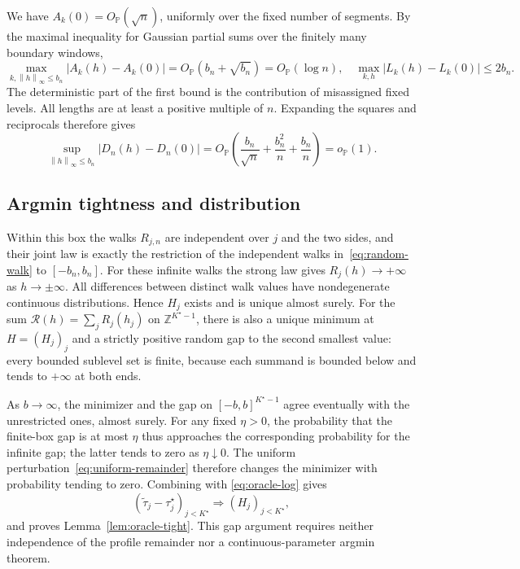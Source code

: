 \documentclass[pdflatex,sn-mathphys-num]{sn-jnl}
\newcommand{\Prob}{\mathbb P}
\newcommand{\Z}{\mathbb Z}
\newcommand{\taus}{\tau^\star}
\newcommand{\op}{o_{\Prob}}
\newcommand{\Op}{O_{\Prob}}
\newcommand{\norm}[1]{\left\lVert#1\right\rVert}
\theoremstyle{thmstyleone}
\theoremstyle{thmstyletwo}
\begin{document}
We have $A_k(0)=\Op(\sqrt n)$, uniformly over the fixed number of segments.
By the maximal inequality for Gaussian partial sums over the finitely many
boundary windows,
\[
\max_{k,\norm h_\infty\le b_n}|A_k(h)-A_k(0)|
=\Op(b_n+\sqrt{b_n})=\Op(\log n),
\quad
\max_{k,h}|L_k(h)-L_k(0)|\le2b_n.
\]
The deterministic part of the first bound is the contribution of
misassigned fixed levels. All lengths are at least a positive multiple of $n$.
Expanding the squares and reciprocals therefore gives
\begin{equation}\label{eq:uniform-remainder}
\sup_{\norm h_\infty\le b_n}|D_n(h)-D_n(0)|
=\Op\left(\frac{b_n}{\sqrt n}+\frac{b_n^2}{n}+\frac{b_n}{n}\right)=\op(1).
\end{equation}

\subsection{Argmin tightness and distribution}
Within this box the walks $R_{j,n}$ are independent over $j$ and the two
sides, and their joint law is exactly the restriction of the independent
walks in~\eqref{eq:random-walk} to $[-b_n,b_n]$.
For these infinite walks the strong law gives $R_j(h)\to+\infty$ as
$h\to\pm\infty$. All differences between distinct walk values have
nondegenerate continuous distributions. Hence $H_j$ exists and is unique
almost surely. For the sum $\mathcal R(h)=\sum_jR_j(h_j)$ on
$\Z^{K^\star-1}$, there is also a unique minimum at $H=(H_j)_j$ and a
strictly positive random gap to the second smallest value: every bounded
sublevel set is finite, because each summand is bounded below and tends
to $+\infty$ at both ends.

As $b\to\infty$, the minimizer and the gap on $[-b,b]^{K^\star-1}$ agree
eventually with the unrestricted ones, almost surely.
For any fixed $\eta>0$, the probability that the finite-box gap is at most
$\eta$ thus approaches the corresponding probability for the infinite gap;
the latter tends to zero as $\eta\downarrow0$.
The uniform perturbation~\eqref{eq:uniform-remainder} therefore changes the
minimizer with probability tending to zero. Combining with
\eqref{eq:oracle-log} gives
\begin{equation}\label{eq:oracle-walk-limit}
(\widetilde\tau_j-\taus_j)_{j<K^\star}\Longrightarrow(H_j)_{j<K^\star},
\end{equation}
and proves Lemma~\ref{lem:oracle-tight}. This gap argument requires neither
independence of the profile remainder nor a continuous-parameter argmin theorem.
\end{document}
